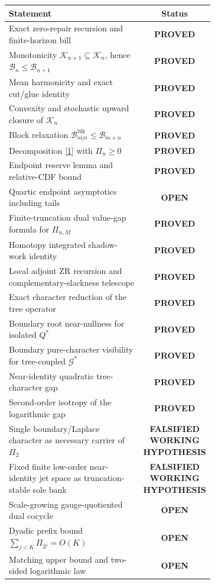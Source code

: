 \documentclass[11pt,a4paper]{article}
\newcommand{\Bcal}{\mathcal B}
\newcommand{\Kcal}{\mathcal K}
\newcommand{\Gcal}{\mathcal G}
\newcommand{\blk}{\mathrm{blk}}
\newcommand{\PROVED}{\textcolor{green!45!black}{\textbf{PROVED}}}
\newcommand{\OPEN}{\textcolor{red!70!black}{\textbf{OPEN}}}
\newcommand{\FALSIFIED}{\textcolor{purple!75!black}{\textbf{FALSIFIED WORKING HYPOTHESIS}}}
\begin{document}
\begin{center}
\small
\begin{tabular}{>{\raggedright\arraybackslash}p{0.69\linewidth}c}
\toprule
Statement & Status\\
\midrule
Exact zero-repair recursion and finite-horizon bill & \PROVED\\
Monotonicity \(\Kcal_{n+1}\subseteq\Kcal_n\), hence \(\Bcal_n\le\Bcal_{n+1}\) & \PROVED\\
Mean harmonicity and exact cut/glue identity & \PROVED\\
Convexity and stochastic upward closure of \(\Kcal_n\) & \PROVED\\
Block relaxation \(\Bcal^{\blk}_{m|n}\le\Bcal_{m+n}\) & \PROVED\\
Decomposition \eqref{1} with \(\Pi_n\ge0\) & \PROVED\\
Endpoint reserve lemma and relative-CDF bound & \PROVED\\
Quartic endpoint asymptotics including tails & \OPEN\\
Finite-truncation dual value-gap formula for \(\Pi_{n,M}\) & \PROVED\\
Homotopy integrated shadow-work identity & \PROVED\\
Local adjoint ZR recursion and complementary-slackness telescope & \PROVED\\
Exact character reduction of the tree operator & \PROVED\\
Boundary root near-nullness for isolated \(Q^*\) & \PROVED\\
Boundary pure-character visibility for tree-coupled \(\Gcal^*\) & \PROVED\\
Near-identity quadratic tree-character gap & \PROVED\\
Second-order isotropy of the logarithmic gap & \PROVED\\
Single boundary/Laplace character as necessary carrier of \(\Pi_2\) & \FALSIFIED\\
Fixed finite low-order near-identity jet space as truncation-stable sole bank & \FALSIFIED\\
Scale-growing gauge-quotiented dual cocycle & \OPEN\\
Dyadic prefix bound \(\sum_{j<K}\Pi_{2^j}=O(K)\) & \OPEN\\
Matching upper bound and two-sided logarithmic law & \OPEN\\
\bottomrule
\end{tabular}
\end{center}
\end{document}
